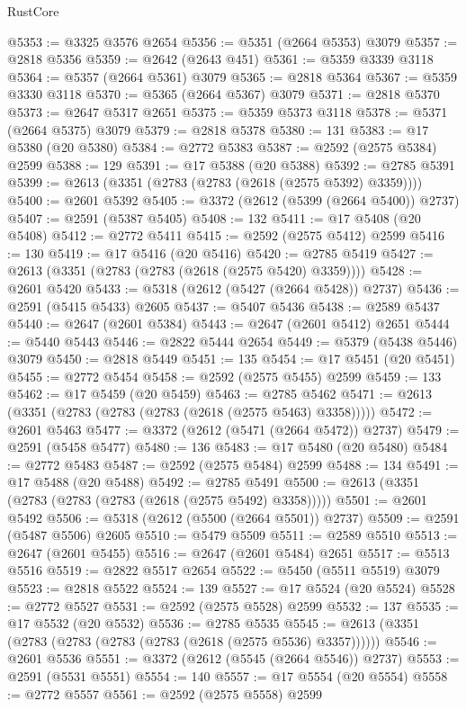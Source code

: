 \begin{lexlean}{RustCore}
\begin{coremodule}
@5353 := @3325 @3576 @2654
@5356 := @5351 (@2664 @5353) @3079
@5357 := @2818 @5356
@5359 := @2642 (@2643 @451)
@5361 := @5359 @3339 @3118
@5364 := @5357 (@2664 @5361) @3079
@5365 := @2818 @5364
@5367 := @5359 @3330 @3118
@5370 := @5365 (@2664 @5367) @3079
@5371 := @2818 @5370
@5373 := @2647 @5317 @2651
@5375 := @5359 @5373 @3118
@5378 := @5371 (@2664 @5375) @3079
@5379 := @2818 @5378
@5380 := 131
@5383 := @17 @5380 (@20 @5380)
@5384 := @2772 @5383
@5387 := @2592 (@2575 @5384) @2599
@5388 := 129
@5391 := @17 @5388 (@20 @5388)
@5392 := @2785 @5391
@5399 := @2613 (@3351 (@2783 (@2783 (@2618 (@2575 @5392) @3359))))
@5400 := @2601 @5392
@5405 := @3372 (@2612 (@5399 (@2664 @5400)) @2737)
@5407 := @2591 (@5387 @5405)
@5408 := 132
@5411 := @17 @5408 (@20 @5408)
@5412 := @2772 @5411
@5415 := @2592 (@2575 @5412) @2599
@5416 := 130
@5419 := @17 @5416 (@20 @5416)
@5420 := @2785 @5419
@5427 := @2613 (@3351 (@2783 (@2783 (@2618 (@2575 @5420) @3359))))
@5428 := @2601 @5420
@5433 := @5318 (@2612 (@5427 (@2664 @5428)) @2737)
@5436 := @2591 (@5415 @5433) @2605
@5437 := @5407 @5436
@5438 := @2589 @5437
@5440 := @2647 (@2601 @5384)
@5443 := @2647 (@2601 @5412) @2651
@5444 := @5440 @5443
@5446 := @2822 @5444 @2654
@5449 := @5379 (@5438 @5446) @3079
@5450 := @2818 @5449
@5451 := 135
@5454 := @17 @5451 (@20 @5451)
@5455 := @2772 @5454
@5458 := @2592 (@2575 @5455) @2599
@5459 := 133
@5462 := @17 @5459 (@20 @5459)
@5463 := @2785 @5462
@5471 := @2613 (@3351 (@2783 (@2783 (@2783 (@2618 (@2575 @5463) @3358)))))
@5472 := @2601 @5463
@5477 := @3372 (@2612 (@5471 (@2664 @5472)) @2737)
@5479 := @2591 (@5458 @5477)
@5480 := 136
@5483 := @17 @5480 (@20 @5480)
@5484 := @2772 @5483
@5487 := @2592 (@2575 @5484) @2599
@5488 := 134
@5491 := @17 @5488 (@20 @5488)
@5492 := @2785 @5491
@5500 := @2613 (@3351 (@2783 (@2783 (@2783 (@2618 (@2575 @5492) @3358)))))
@5501 := @2601 @5492
@5506 := @5318 (@2612 (@5500 (@2664 @5501)) @2737)
@5509 := @2591 (@5487 @5506) @2605
@5510 := @5479 @5509
@5511 := @2589 @5510
@5513 := @2647 (@2601 @5455)
@5516 := @2647 (@2601 @5484) @2651
@5517 := @5513 @5516
@5519 := @2822 @5517 @2654
@5522 := @5450 (@5511 @5519) @3079
@5523 := @2818 @5522
@5524 := 139
@5527 := @17 @5524 (@20 @5524)
@5528 := @2772 @5527
@5531 := @2592 (@2575 @5528) @2599
@5532 := 137
@5535 := @17 @5532 (@20 @5532)
@5536 := @2785 @5535
@5545 := @2613 (@3351 (@2783 (@2783 (@2783 (@2783 (@2618 (@2575 @5536) @3357))))))
@5546 := @2601 @5536
@5551 := @3372 (@2612 (@5545 (@2664 @5546)) @2737)
@5553 := @2591 (@5531 @5551)
@5554 := 140
@5557 := @17 @5554 (@20 @5554)
@5558 := @2772 @5557
@5561 := @2592 (@2575 @5558) @2599

\end{coremodule}
\end{lexlean}
